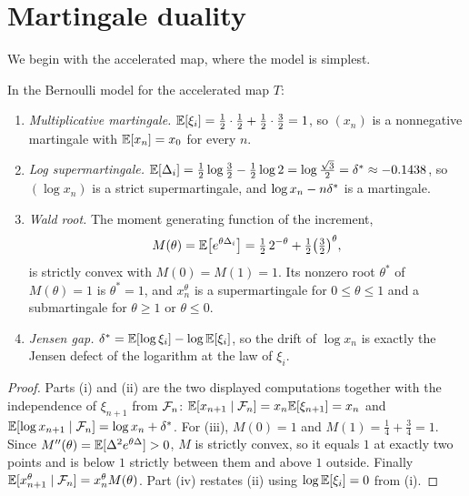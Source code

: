 \section{Martingale duality}\label{sec:ch3:duality}

We begin with the accelerated map, where the model is simplest.

\begin{proposition}\label{thm:martingale}
In the Bernoulli model for the accelerated map $T$:
\begin{enumerate}[label=(\roman*),leftmargin=2em]
\item \emph{Multiplicative martingale.} $\mathbb{E}[\xi_i]=\tfrac12\cdot\tfrac12+
  \tfrac12\cdot\tfrac32=1$, so $(x_n)$ is a nonnegative martingale with
  $\mathbb{E}[x_n]=x_0$ for every $n$.
\item \emph{Log supermartingale.} $\mathbb{E}[\Delta_i]=\tfrac12\log\tfrac32-\tfrac12\log2
  =\log\frac{\sqrt3}{2}=\delta^{*}\approx-0.1438$, so $(\log x_n)$ is a strict
  supermartingale, and $\log x_n-n\delta^{*}$ is a martingale.
\item \emph{Wald root.} The moment generating function of the increment,
  \[
    M(\theta)=\mathbb{E}\bigl[e^{\theta\Delta_i}\bigr]=\tfrac12\,2^{-\theta}+
    \tfrac12\bigl(\tfrac32\bigr)^{\theta},
  \]
  is strictly convex with $M(0)=M(1)=1$. Its nonzero root
  $\theta^*$ of $M(\theta)=1$ is $\theta^*=1$, and $x_n^{\theta}$ is a
  supermartingale for $0\le\theta\le1$ and a submartingale for $\theta\geq1$
  or $\theta\le0$.
\item \emph{Jensen gap.} $\delta^{*}=\mathbb{E}[\log\xi_i]-\log\mathbb{E}[\xi_i]$, so the drift of
  $\log x_n$ is exactly the Jensen defect of the logarithm at the law of
  $\xi_i$.
\end{enumerate}
\end{proposition}

\begin{proof}
Parts (i) and (ii) are the two displayed computations together with the
independence of $\xi_{n+1}$ from $\mathcal{F}_n$: $\mathbb{E}[x_{n+1}\mid\mathcal{F}_n]=x_n\mathbb{E}[\xi_{n+1}]
=x_n$ and $\mathbb{E}[\log x_{n+1}\mid\mathcal{F}_n]=\log x_n+\delta^{*}$. For (iii),
$M(0)=1$ and $M(1)=\tfrac14+\tfrac34=1$. Since $M''(\theta)=\mathbb{E}[\Delta^2e^{\theta
\Delta}]>0$, $M$ is strictly convex, so it equals $1$ at exactly two points and
is below $1$ strictly between them and above $1$ outside. Finally
$\mathbb{E}[x_{n+1}^\theta\mid\mathcal{F}_n]=x_n^\theta M(\theta)$. Part (iv) restates (ii)
using $\log\mathbb{E}[\xi_i]=0$ from (i).
\end{proof}

